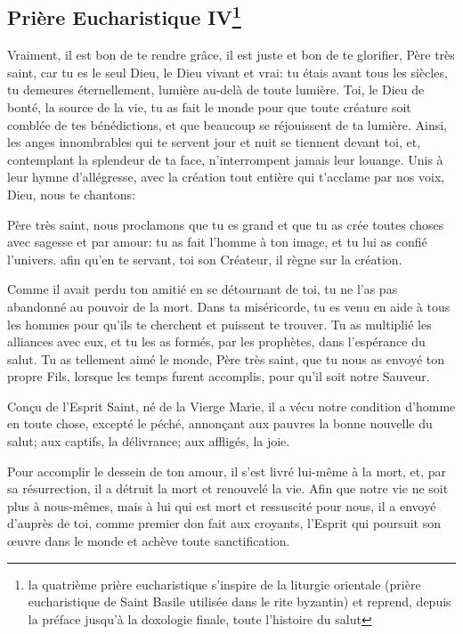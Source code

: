 \subsection*{Prière Eucharistique IV\footnote{la quatrième prière eucharistique s’inspire de la liturgie orientale
(prière eucharistique de Saint Basile utilisée dans le rite byzantin) et 
reprend, depuis la préface jusqu’à la doxologie finale, toute l’histoire du salut}}\label{pe4}

Vraiment, il est bon de te rendre grâce,
il est juste et bon de te glorifier, Père très saint,
car tu es le seul Dieu, le Dieu vivant et vrai:
tu étais avant tous les siècles,
tu demeures éternellement,
lumière au-delà de toute lumière.
Toi, le Dieu de bonté, la source de la vie,
tu as fait le monde
pour que toute créature
soit comblée de tes bénédictions,
et que beaucoup se réjouissent de ta lumière.
Ainsi, les anges innombrables
qui te servent jour et nuit
se tiennent devant toi,
et, contemplant la splendeur de ta face,
n'interrompent jamais leur louange.
Unis à leur hymne d'allégresse,
avec la création tout entière
qui t'acclame par nos voix,
Dieu, nous te chantons:




Père très saint,
nous proclamons que tu es grand
et que tu as crée toutes choses
avec sagesse et par amour:
tu as fait l'homme à ton image,
et tu lui as confié l'univers.
afin qu'en te servant, toi son Créateur,
il règne sur la création.

Comme il avait perdu ton amitié
en se détournant de toi,
tu ne l'as pas abandonné au pouvoir de la mort.
Dans ta miséricorde,
tu es venu en aide à tous les hommes
pour qu'ils te cherchent et puissent te trouver.
Tu as multiplié les alliances avec eux,
et tu les as formés, par les prophètes,
dans l'espérance du salut.
Tu as tellement aimé le monde,
Père très saint,
que tu nous as envoyé ton propre Fils,
lorsque les temps furent accomplis,
pour qu'il soit notre Sauveur.

Conçu de l'Esprit Saint,
né de la Vierge Marie,
il a vécu notre condition d'homme
en toute chose, excepté le péché,
annonçant aux pauvres
la bonne nouvelle du salut;
aux captifs, la délivrance;
aux affligés, la joie.

Pour accomplir le dessein de ton amour,
il s'est livré lui-même à la mort,
et, par sa résurrection,
il a détruit la mort et renouvelé la vie.
Afin que notre vie ne soit plus à nous-mêmes,
mais à lui qui est mort et ressuscité pour nous,
il a envoyé d'auprès de toi,
comme premier don fait aux croyants,
l'Esprit qui poursuit son œuvre dans le monde
et achève toute sanctification.

